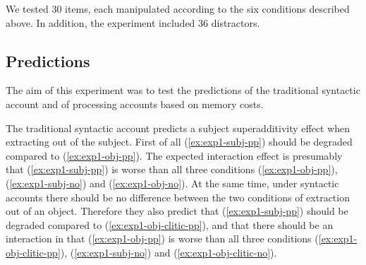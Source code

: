 \eal 
{}
\label{ex:exp1-subj-no}
\label{ex:exp1-obj-clitic-no}
\label{ex:exp1-obj-no}
\zl 

We tested 30 items, each manipulated according to the six conditions described above. In addition, the experiment included 36 distractors. 

\subsection{Predictions}

The aim of this experiment was to test the predictions of the traditional syntactic account and of processing accounts based on memory costs.

The traditional syntactic account predicts a subject superadditivity effect when extracting out of the subject. First of all (\ref{ex:exp1-subj-pp}) should be degraded compared to (\ref{ex:exp1-obj-pp}). The expected interaction effect is presumably that (\ref{ex:exp1-subj-pp}) is worse than all three conditions (\ref{ex:exp1-obj-pp}), (\ref{ex:exp1-subj-no}) and (\ref{ex:exp1-obj-no}). At the same time, under syntactic accounts there should be no difference between the two conditions of extraction out of an object. Therefore they also predict that (\ref{ex:exp1-subj-pp}) should be degraded compared to (\ref{ex:exp1-obj-clitic-pp}), and that there should be an interaction in that (\ref{ex:exp1-obj-pp}) is worse than all three conditions (\ref{ex:exp1-obj-clitic-pp}), (\ref{ex:exp1-subj-no}) and (\ref{ex:exp1-obj-clitic-no}).

